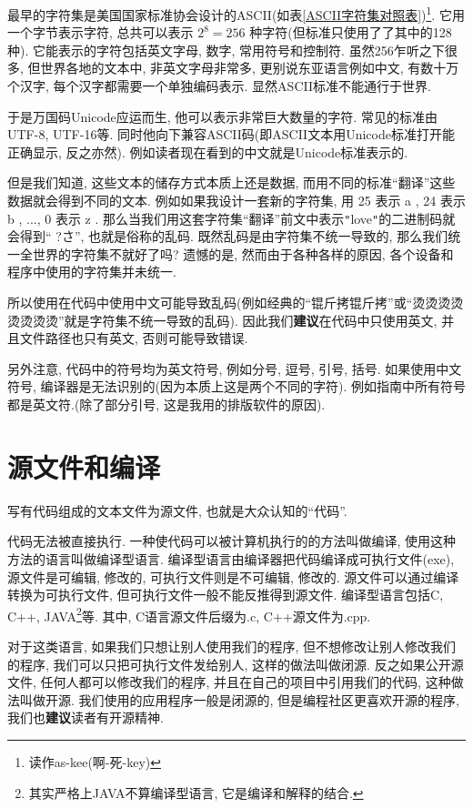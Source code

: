         最早的字符集是美国国家标准协会设计的ASCII(如表\ref{ASCII字符集对照表})\footnote{读作as-kee(啊-死-key)}. 它用一个字节表示字符, 总共可以表示 $ 2 ^ 8 = 256 $ 种字符(但标准只使用了了其中的128种). 它能表示的字符包括英文字母, 数字, 常用符号和控制符. 虽然256乍听之下很多, 但世界各地的文本中, 非英文字母非常多, 更别说东亚语言例如中文, 有数十万个汉字, 每个汉字都需要一个单独编码表示. 显然ASCII标准不能通行于世界.

        于是万国码Unicode应运而生, 他可以表示非常巨大数量的字符. 常见的标准由UTF-8, UTF-16等. 同时他向下兼容ASCII码(即ASCII文本用Unicode标准打开能正确显示, 反之亦然). 例如读者现在看到的中文就是Unicode标准表示的.

        但是我们知道, 这些文本的储存方式本质上还是数据, 而用不同的标准``翻译''这些数据就会得到不同的文本. 例如如果我设计一套新的字符集, 用 25 表示 a , 24 表示 b , ..., 0 表示 z . 那么当我们用这套字符集``翻译''前文中表示\texttt{"}love\texttt{"}的二进制码就会得到`` ?\makebox[0pt][r]{$ \ \square$}さ'', 也就是俗称的乱码. 既然乱码是由字符集不统一导致的, 那么我们统一全世界的字符集不就好了吗? 遗憾的是, 然而由于各种各样的原因, 各个设备和程序中使用的字符集并未统一.
        
        所以使用在代码中使用中文可能导致乱码(例如经典的``锟斤拷锟斤拷''或``烫烫烫烫烫烫烫烫''就是字符集不统一导致的乱码). 因此我们\textbf{建议}在代码中只使用英文, 并且文件路径也只有英文, 否则可能导致错误.

        另外注意, 代码中的符号均为英文符号, 例如分号, 逗号, 引号, 括号. 如果使用中文符号, 编译器是无法识别的(因为本质上这是两个不同的字符). 例如指南中所有符号都是英文符.(除了部分引号, 这是我用的排版软件的原因).
        
    \section{源文件和编译}
        写有代码组成的文本文件为源文件, 也就是大众认知的``代码''. 
        
        代码无法被直接执行. 一种使代码可以被计算机执行的的方法叫做编译, 使用这种方法的语言叫做编译型语言. 编译型语言由编译器把代码编译成可执行文件(exe), 源文件是可编辑, 修改的, 可执行文件则是不可编辑, 修改的. 源文件可以通过编译转换为可执行文件, 但可执行文件一般不能反推得到源文件. 编译型语言包括C, C++, JAVA\footnote{其实严格上JAVA不算编译型语言, 它是编译和解释的结合.}等. 其中, C语言源文件后缀为.c, C++源文件为.cpp.
        
        对于这类语言, 如果我们只想让别人使用我们的程序, 但不想修改让别人修改我们的程序, 我们可以只把可执行文件发给别人, 这样的做法叫做闭源. 反之如果公开源文件, 任何人都可以修改我们的程序, 并且在自己的项目中引用我们的代码, 这种做法叫做开源. 我们使用的应用程序一般是闭源的, 但是编程社区更喜欢开源的程序, 我们也\textbf{建议}读者有开源精神.

